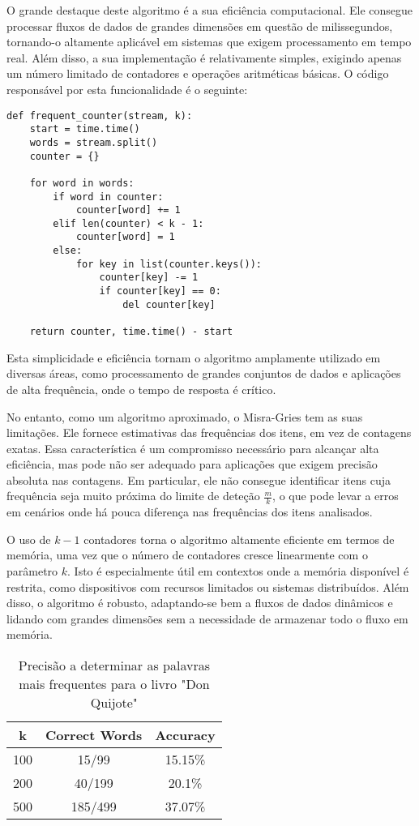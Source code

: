 \documentclass[shortpaper, portugues, times, mirror]{revdetua}
\begin{document}
O grande destaque deste algoritmo é a sua eficiência computacional. Ele consegue processar fluxos de dados de grandes dimensões em questão de milissegundos, tornando-o altamente aplicável em sistemas que exigem processamento em tempo real. Além disso, a sua implementação é relativamente simples, exigindo apenas um número limitado de contadores e operações aritméticas básicas. O código responsável por esta funcionalidade é o seguinte:
\begin{lstlisting}
def frequent_counter(stream, k):
    start = time.time()
    words = stream.split()
    counter = {}

    for word in words:
        if word in counter:
            counter[word] += 1
        elif len(counter) < k - 1:
            counter[word] = 1
        else:
            for key in list(counter.keys()):
                counter[key] -= 1
                if counter[key] == 0:
                    del counter[key]

    return counter, time.time() - start
\end{lstlisting}

Esta simplicidade e eficiência tornam o algoritmo amplamente utilizado em diversas áreas, como processamento de grandes conjuntos de dados e aplicações de alta frequência, onde o tempo de resposta é crítico.

No entanto, como um algoritmo aproximado, o Misra-Gries tem as suas limitações. Ele fornece estimativas das frequências dos itens, em vez de contagens exatas. Essa característica é um compromisso necessário para alcançar alta eficiência, mas pode não ser adequado para aplicações que exigem precisão absoluta nas contagens. Em particular, ele não consegue identificar itens cuja frequência seja muito próxima do limite de deteção \(\frac{m}{k}\), o que pode levar a erros em cenários onde há pouca diferença nas frequências dos itens analisados.

O uso de \(k-1\) contadores torna o algoritmo altamente eficiente em termos de memória, uma vez que o número de contadores cresce linearmente com o parâmetro \(k\). Isto é especialmente útil em contextos onde a memória disponível é restrita, como dispositivos com recursos limitados ou sistemas distribuídos. Além disso, o algoritmo é robusto, adaptando-se bem a fluxos de dados dinâmicos e lidando com grandes dimensões sem a necessidade de armazenar todo o fluxo em memória.

\begin{table}[h!]
\centering
\begin{tabular}{|c|c|c|}
\hline
\textbf{k} & \textbf{Correct Words} & \textbf{Accuracy} \\ \hline
100 & 15/99 & 15.15\% \\ \hline
200 & 40/199 & 20.1\% \\ \hline
500 & 185/499 & 37.07\% \\ \hline
\end{tabular}
\caption{Precisão a determinar as palavras mais frequentes para o livro "Don Quijote"}
\label{tab:accuracy}
\end{table}
\end{document}
